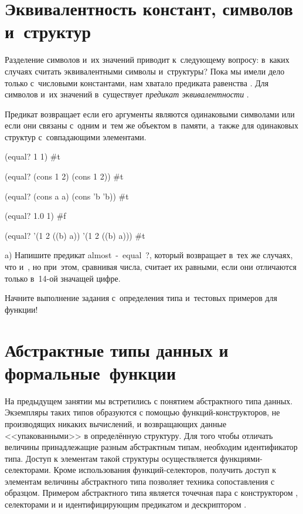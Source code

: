 \section[4]{Эквивалентность констант, символов и~структур}%
Разделение символов и~их значений приводит к~следующему вопросу: в~каких случаях считать эквивалентными символы и~структуры? Пока мы имели дело только с~числовыми константами, нам хватало предиката равенства \s{=}. Для символов и~их значений в~\Scheme существует \emph{предикат эквивалентности} .

Предикат  возвращает  если его аргументы являются одинаковыми символами или если они связаны с~одним и~тем же объектом в~памяти, а~также для одинаковых структур с~совпадающими элементами.

\REPL
  {(equal? 1 1)}
  {\#t}

\REPL
  {(equal? (cons 1 2) (cons 1 2))}
  {\#t}

\REPL
  {(equal? (cons a a) (cons 'b 'b))}
  {\#t}

\REPL
  {(equal? 1.0 1)}
  {\#f}

\REPL
  {(equal? '(1 2 ((b) a)) '(1 2 ((b) a)))}
  {\#t} 

\begin{Assignment}
a) Напишите предикат \si{almost-equal?}, который возвращает  в~тех же случаях, что и~, но при~этом, сравнивая числа, считает их равными, если они отличаются только в~14-ой значащей цифре.

\begin{Tip}
Начните выполнение задания с~определения типа и~тестовых примеров для функции!
\end{Tip}

\end{Assignment}


\section[4]{Абстрактные типы данных и \mbox{формальные~функции}}%
%
На предыдущем занятии мы встретились с понятием абстрактного типа данных. Экземпляры таких типов образуются с помощью функций-конструкторов, не производящих никаких вычислений, и возвращающих данные <<упакованными>> в определённую структуру. Для того чтобы отличать величины принадлежащие разным абстрактным типам, необходим идентификатор типа. Доступ к элементам такой структуры осуществляется функциями-селекторами. Кроме использования функций-селекторов, получить доступ к элементам величины абстрактного типа позволяет техника сопоставления с образцом. Примером абстрактного типа является точечная пара с конструктором , селекторами  и  и идентифицирующим предикатом  и дескриптором .


